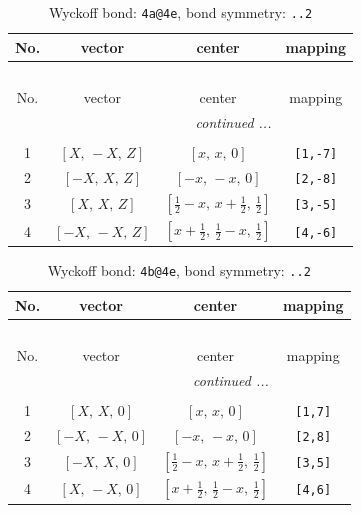 \documentclass[fleqn,8pt]{jsarticle}
\begin{document}
\begin{longtable}{cccc}
\caption{Wyckoff bond: {\tt 4a@4e}, bond symmetry: {\tt ..2}}
 \\
 \hline \hline
No. & vector & center & mapping \\ \hline \endfirsthead

\multicolumn{3}{l}{\tablename\ \thetable{}} \\
 \hline \hline
No. & vector & center & mapping \\ \hline \endhead

 \hline \hline
\multicolumn{3}{r}{\footnotesize\it continued ...} \\ \endfoot

 \hline \hline
\multicolumn{3}{r}{} \\ \endlastfoot

1 & $\left[ X,\, - X,\, Z \right]$ & $\left[ x,\, x,\, 0 \right]$ & {\tt [1,-7]} \\ \hline
2 & $\left[ - X,\, X,\, Z \right]$ & $\left[ - x,\, - x,\, 0 \right]$ & {\tt [2,-8]} \\ \hline
3 & $\left[ X,\, X,\, Z \right]$ & $\left[ \frac{1}{2} - x,\, x + \frac{1}{2},\, \frac{1}{2} \right]$ & {\tt [3,-5]} \\ \hline
4 & $\left[ - X,\, - X,\, Z \right]$ & $\left[ x + \frac{1}{2},\, \frac{1}{2} - x,\, \frac{1}{2} \right]$ & {\tt [4,-6]} \\
\end{longtable}
\renewcommand{\arraystretch}{1.2}
\begin{longtable}{cccc}
\caption{Wyckoff bond: {\tt 4b@4e}, bond symmetry: {\tt ..2}}
 \\
 \hline \hline
No. & vector & center & mapping \\ \hline \endfirsthead

\multicolumn{3}{l}{\tablename\ \thetable{}} \\
 \hline \hline
No. & vector & center & mapping \\ \hline \endhead

 \hline \hline
\multicolumn{3}{r}{\footnotesize\it continued ...} \\ \endfoot

 \hline \hline
\multicolumn{3}{r}{} \\ \endlastfoot

1 & $\left[ X,\, X,\, 0 \right]$ & $\left[ x,\, x,\, 0 \right]$ & {\tt [1,7]} \\ \hline
2 & $\left[ - X,\, - X,\, 0 \right]$ & $\left[ - x,\, - x,\, 0 \right]$ & {\tt [2,8]} \\ \hline
3 & $\left[ - X,\, X,\, 0 \right]$ & $\left[ \frac{1}{2} - x,\, x + \frac{1}{2},\, \frac{1}{2} \right]$ & {\tt [3,5]} \\ \hline
4 & $\left[ X,\, - X,\, 0 \right]$ & $\left[ x + \frac{1}{2},\, \frac{1}{2} - x,\, \frac{1}{2} \right]$ & {\tt [4,6]} \\
\end{longtable}
\end{document}
